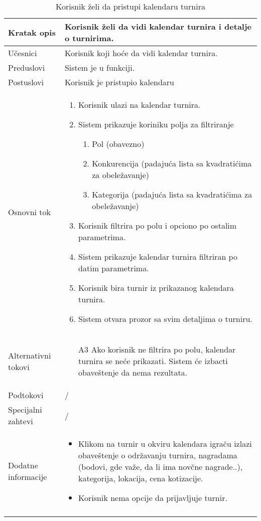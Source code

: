 \documentclass{article}
\begin{document}
    \begin{longtable}{| p{} | p{} |} 
        \hline
            Kratak opis & Korisnik želi da vidi kalendar turnira i detalje o turnirima.\\ 
        \hline    
            Učesnici & Korisnik koji hoće da vidi kalendar turnira. \\
        \hline
            Preduslovi &  Sistem je u funkciji.\\
        \hline  
            Postuslovi &  Korisnik je pristupio kalendaru\\
        \hline
            Osnovni tok & 
                \begin{enumerate}
                    \item Korisnik ulazi na kalendar turnira.
                    \item Sistem prikazuje koriniku polja za filtriranje \begin{enumerate}
                        \item Pol (obavezno)
                        \item Konkurencija (padajuća lista sa kvadratićima za obeležavanje)
                        \item Kategorija (padajuća lista sa kvadratićima za obeležavanje)
                    \end{enumerate}
                    \item Korisnik filtrira po polu i opciono po ostalim parametrima.
                    \item Sistem prikazuje kalendar turnira filtriran po datim parametrima.
                    \item Korisnik bira turnir iz prikazanog kalendara turnira.
                    \item Sistem otvara prozor sa svim detaljima o turniru.
                \end{enumerate}\\
        \hline
            Alternativni tokovi & \begin{itemize}
                \item[A3] Ako korisnik ne filtrira po polu, kalendar turnira se neće prikazati. Sistem će izbacti obaveštenje da nema rezultata.
            \end{itemize}\\
        \hline
            Podtokovi & /\\
        \hline
            Specijalni zahtevi & /\\
        \hline
            Dodatne informacije & 
                \begin{itemize}
                    \item Klikom na turnir u okviru kalendara igraču izlazi obaveštenje o održavanju turnira, nagradama (bodovi, gde važe, da li ima novčne nagrade..), kategorija, lokacija, cena kotizacije. 
                    \item Korisnik nema opcije da prijavljuje turnir.
                \end{itemize} \\
        \hline
        \caption{Korisnik želi da pristupi kalendaru turnira} 
    \end{longtable}
\end{document}
